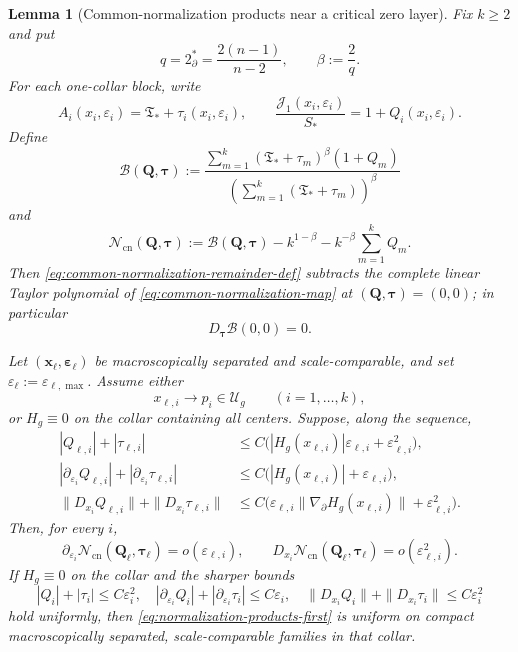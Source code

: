 \documentclass[11pt,reqno,a4paper]{amsart}
\numberwithin{equation}{section}
\theoremstyle{plain}
\newtheorem{lemma}[theorem]{Lemma}
\theoremstyle{remark}
\theoremstyle{plain}
\begin{document}
\begin{lemma}[Common-normalization products near a critical zero layer]
\label{lem:normalization-products-critical-zero}
Fix $k\ge2$ and put
\[
q=2^*_{\partial}=\frac{2(n-1)}{n-2},
\qquad
\beta:=\frac2q.
\]
For each one-collar block, write
\[
A_i(x_i,\varepsilon_i)=\mathfrak T_\ast+\tau_i(x_i,\varepsilon_i),
\qquad
\frac{\mathcal J_1(x_i,\varepsilon_i)}{S_\ast}=1+Q_i(x_i,\varepsilon_i).
\]
Define
\begin{equation}\label{eq:common-normalization-map}
\mathscr B(\mathbf Q,\boldsymbol\tau)
:=
\frac{\displaystyle\sum_{m=1}^k(\mathfrak T_\ast+\tau_m)^\beta(1+Q_m)}
     {\displaystyle\left(\sum_{m=1}^k(\mathfrak T_\ast+\tau_m)\right)^\beta}
\end{equation}
and
\begin{equation}\label{eq:common-normalization-remainder-def}
\mathcal N_{\mathrm{cn}}(\mathbf Q,\boldsymbol\tau)
:=
\mathscr B(\mathbf Q,\boldsymbol\tau)
-k^{1-\beta}
-k^{-\beta}\sum_{m=1}^k Q_m .
\end{equation}
Then \eqref{eq:common-normalization-remainder-def} subtracts the complete linear Taylor polynomial of
\eqref{eq:common-normalization-map} at $(\mathbf Q,\boldsymbol\tau)=(0,0)$; in particular
\begin{equation}\label{eq:cn-tau-cancellation}
D_{\boldsymbol\tau}\mathscr B(0,0)=0.
\end{equation}

Let $(\mathbf x_\ell,\boldsymbol\varepsilon_\ell)$ be macroscopically separated and scale-comparable, and set
$\varepsilon_\ell:=\varepsilon_{\ell,\max}$.  Assume either
\[
x_{\ell,i}\to p_i\in\mathcal U_g
\qquad(i=1,\dots,k),
\]
or $H_g\equiv0$ on the collar containing all centers.  Suppose, along the sequence,
\begin{align}
|Q_{\ell,i}|+|\tau_{\ell,i}|
&\le C\bigl(|H_g(x_{\ell,i})|\varepsilon_{\ell,i}+\varepsilon_{\ell,i}^2\bigr),
\label{eq:cn-defect-value}\\
|\partial_{\varepsilon_i}Q_{\ell,i}|+|\partial_{\varepsilon_i}\tau_{\ell,i}|
&\le C\bigl(|H_g(x_{\ell,i})|+\varepsilon_{\ell,i}\bigr),
\label{eq:cn-defect-scale}\\
\|D_{x_i}Q_{\ell,i}\|+\|D_{x_i}\tau_{\ell,i}\|
&\le C\bigl(\varepsilon_{\ell,i}\|\nabla_{\partial}H_g(x_{\ell,i})\|+\varepsilon_{\ell,i}^2\bigr).
\label{eq:cn-defect-center}
\end{align}
Then, for every $i$,
\begin{equation}\label{eq:normalization-products-first}
\partial_{\varepsilon_i}\mathcal N_{\mathrm{cn}}(\mathbf Q_\ell,\boldsymbol\tau_\ell)
=o(\varepsilon_{\ell,i}),
\qquad
D_{x_i}\mathcal N_{\mathrm{cn}}(\mathbf Q_\ell,\boldsymbol\tau_\ell)
=o(\varepsilon_{\ell,i}^2).
\end{equation}
If $H_g\equiv0$ on the collar and the sharper bounds
\[
|Q_i|+|\tau_i|\le C\varepsilon_i^2,
\quad
|\partial_{\varepsilon_i}Q_i|+|\partial_{\varepsilon_i}\tau_i|\le C\varepsilon_i,
\quad
\|D_{x_i}Q_i\|+\|D_{x_i}\tau_i\|\le C\varepsilon_i^2
\]
hold uniformly, then \eqref{eq:normalization-products-first} is uniform on compact macroscopically separated,
scale-comparable families in that collar.


\end{lemma}
\end{document}
